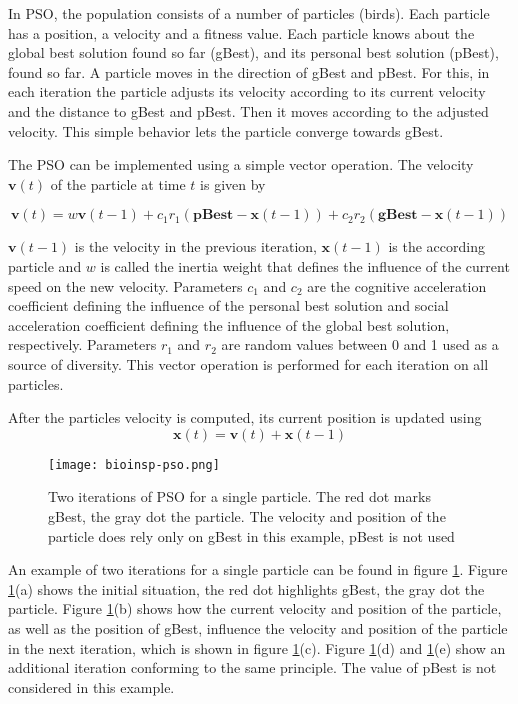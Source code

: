 In PSO, the population consists of a number of particles (birds). Each particle has a position, a velocity and a fitness value. Each particle knows about the global best solution found so far (gBest), and its personal best solution (pBest), found so far. A particle moves in the direction of gBest and pBest. For this, in each iteration the particle adjusts its velocity according to its current velocity and the distance to gBest and pBest. Then it moves according to the adjusted velocity. This simple behavior lets the particle converge towards gBest.

The PSO can be implemented using a simple vector operation. The velocity $\mathbf{v}(t)$ of the particle at time $t$ is given by

\begin{equation}\label{eq:pso-speed}
  \mathbf{v}(t) = w \mathbf{v}(t - 1) + c_1 r_1 (\mathbf{pBest} - \mathbf{x}(t - 1)) + c_2 r_2 (\mathbf{gBest} - \mathbf{x}(t - 1))
\end{equation}

$\mathbf{v}(t - 1)$ is the velocity in the previous iteration, $\mathbf{x}(t - 1)$ is the according particle and $w$ is called the inertia weight that defines the influence of the current speed on the new velocity. Parameters $c_1$ and $c_2$ are the cognitive acceleration coefficient defining the influence of the personal best solution and social acceleration coefficient defining the influence of the global best solution, respectively. Parameters $r_1$ and $r_2$ are random values between 0 and 1 used as a source of diversity. This vector operation is performed for each iteration on all particles.

After the particles velocity is computed, its current position is updated using
\begin{equation}\label{eq:pso-position}
  \mathbf{x}(t) = \mathbf{v}(t) + \mathbf{x}(t - 1)
\end{equation}

\begin{figure}
  \centering
  \texttt{[image: bioinsp-pso.png]}
  \caption[PSO iterations]{Two iterations of PSO for a single particle. The red dot marks gBest, the gray dot the particle. The velocity and position of the particle does rely only on gBest in this example, pBest is not used}
  \label{fig:pso}
\end{figure}

An example of two iterations for a single particle can be found in figure \ref{fig:pso}. Figure \ref{fig:pso}(a) shows the initial situation, the red dot highlights gBest, the gray dot the particle. Figure \ref{fig:pso}(b) shows how the current velocity and position of the particle, as well as the position of gBest, influence the velocity and position of the particle in the next iteration, which is shown in figure \ref{fig:pso}(c). Figure \ref{fig:pso}(d) and \ref{fig:pso}(e) show an additional iteration conforming to the same principle. The value of pBest is not considered in this example.

